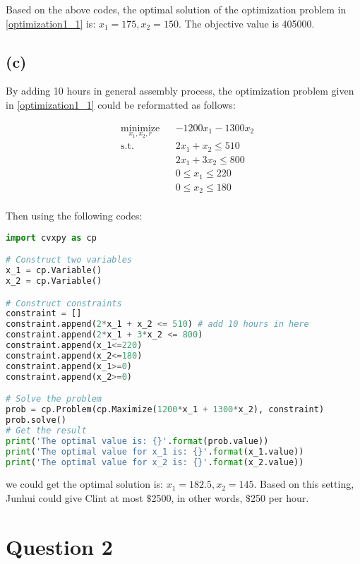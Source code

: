 \documentclass[12pt,letterpaper]{article}
\begin{document}
Based on the above codes, the optimal solution of the optimization problem in \ref{optimization1_1} is: $x_1=175, x_2=150$. The objective value is 405000. 

\subsection*{(c)}

By adding 10 hours in general assembly process, the optimization problem given in \ref{optimization1_1} could be reformatted as follows:

\begin{equation}
\begin{aligned}
& \underset{x_1, x_2, r}{\text{minimize}}
& & -1200x_1 - 1300x_2\\
& \text{s.t.} & &  2x_1+x_2 \leq 510 \\
& & & 2x_1+3x_2 \leq 800 \\
& & &  0 \leq x_1 \leq 220 \\
& & &  0 \leq x_2 \leq 180 \\
\end{aligned}
\label{optimization1_3}
\end{equation}

Then using the following codes:

\begin{lstlisting}[language=Python, caption=Question 1.c]
import cvxpy as cp

# Construct two variables
x_1 = cp.Variable()
x_2 = cp.Variable()

# Construct constraints
constraint = []
constraint.append(2*x_1 + x_2 <= 510) # add 10 hours in here
constraint.append(2*x_1 + 3*x_2 <= 800)
constraint.append(x_1<=220)
constraint.append(x_2<=180)
constraint.append(x_1>=0)
constraint.append(x_2>=0)

# Solve the problem
prob = cp.Problem(cp.Maximize(1200*x_1 + 1300*x_2), constraint)
prob.solve()
# Get the result
print('The optimal value is: {}'.format(prob.value))
print('The optimal value for x_1 is: {}'.format(x_1.value))
print('The optimal value for x_2 is: {}'.format(x_2.value))
\end{lstlisting}

we could get the optimal solution is: $x_1 = 182.5, x_2 = 145$. Based on this setting, Junhui could give Clint at most $\$$2500, in other words, $\$$250 per hour.

\section*{Question 2}
\end{document}
